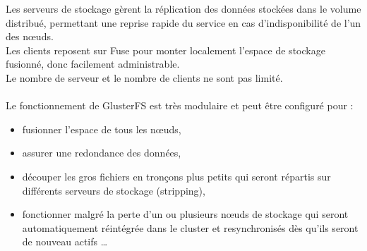 \documentclass[12pt]{report}
\begin{document}
Les serveurs de stockage gèrent la réplication des données stockées dans le volume distribué, permettant une reprise rapide du service en cas d'indisponibilité de l'un des nœuds. \\
Les clients reposent sur Fuse pour monter localement l'espace de stockage fusionné, donc facilement administrable.\\
Le nombre de serveur et le nombre de clients ne sont pas limité.\\\\
Le fonctionnement de GlusterFS est très modulaire et peut être configuré pour :\\
	\begin{itemize}
		\item fusionner l'espace de tous les nœuds,
		\item assurer une redondance des données,
		\item découper les gros fichiers en tronçons plus petits qui seront répartis sur différents serveurs de stockage (stripping),
		\item fonctionner malgré la perte d'un ou plusieurs nœuds de stockage qui seront automatiquement réintégrée dans le cluster et resynchronisés dès qu'ils seront de nouveau actifs \dots \\
	\end{itemize}
\newpage
\end{document}
